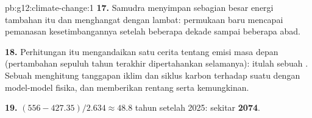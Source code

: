 \begin{solution}{pb:g12:climate-change:1}
\textbf{17.} Samudra menyimpan sebagian besar energi tambahan itu dan
menghangat dengan lambat: permukaan baru mencapai pemanasan kesetimbangannya
setelah beberapa dekade sampai beberapa abad.

\textbf{18.} Perhitungan itu mengandaikan satu cerita tentang emisi masa depan
(pertambahan sepuluh tahun terakhir dipertahankan selamanya): itulah sebuah
. Sebuah  menghitung tanggapan iklim dan siklus karbon
terhadap suatu  dengan model-model fisika, dan memberikan
rentang serta kemungkinan.

\textbf{19.} $(556 - 427.35)/2.634 \approx 48.8$ tahun setelah 2025: sekitar
\textbf{2074}.
\end{solution}
